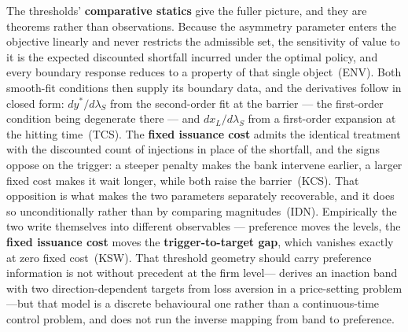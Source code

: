 \documentclass[11pt]{article}
\begin{document}
The thresholds' \textbf{comparative statics} give the fuller picture, and they
are theorems rather than observations. Because the asymmetry parameter
enters the objective linearly and never restricts the admissible set, the
sensitivity of value to it is the expected discounted shortfall incurred
under the optimal policy, and every boundary response reduces to a
property of that single object~(ENV). Both smooth-fit conditions then
supply its boundary data, and the derivatives follow in closed form:
$dy^*/d\lambda_S$ from the second-order fit at the barrier ---
the first-order condition being degenerate there --- and $dx_L/d\lambda_S$
from a first-order expansion at the hitting time~(TCS). The
\textbf{fixed issuance cost} admits the identical treatment with the discounted
count of injections in place of the shortfall, and the signs oppose on the
trigger: a steeper penalty makes the bank intervene earlier, a larger
fixed cost makes it wait longer, while both raise the barrier~(KCS). That
opposition is what makes the two parameters separately recoverable, and it
does so unconditionally rather than by comparing magnitudes~(IDN).
Empirically the two write themselves into different observables ---
preference moves the levels, the \textbf{fixed issuance cost} moves the
\textbf{trigger-to-target gap}, which vanishes exactly at zero fixed cost~(KSW). That threshold geometry should carry preference
information is not without precedent at the firm level---\citet{angelis2025}
derives an inaction band with two direction-dependent targets from loss
aversion in a price-setting problem---but that model is a discrete
behavioural one rather than a continuous-time control problem, and does
not run the inverse mapping from band to preference.
\end{document}
